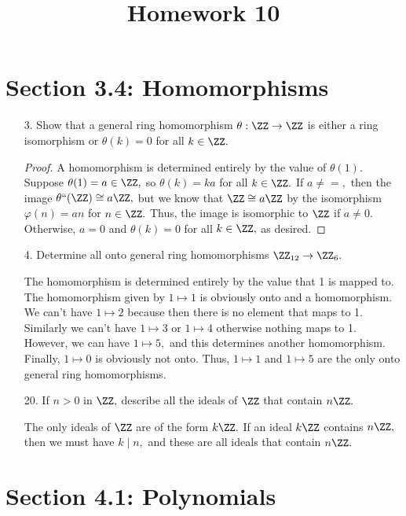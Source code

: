 \documentclass{article}
\begin{document}
\title{Homework 10}
\maketitle
\thispagestyle{fancy}

\section*{Section 3.4: Homomorphisms}

\begin{itemize}
	\item[3.] Show that a general ring homomorphism $\theta:\ZZ\to \ZZ$ is either a ring isomorphism or $\theta(k)=0$ for all $k\in \ZZ.$
		\begin{proof}
			A homomorphism is determined entirely by the value of $\theta(1).$ Suppose $\theta(1)=a\in\ZZ,$ so $\theta(k)=ka$ for all $k\in \ZZ.$ If $a\neq =,$ then the image $\theta``(\ZZ)\cong a\ZZ,$ but we know that $\ZZ\cong a\ZZ$ by the isomorphism $\varphi(n)=an$ for $n\in \ZZ.$ Thus, the image is isomorphic to $\ZZ$ if $a\neq 0.$ Otherwise, $a=0$ and $\theta(k)=0$ for all $k\in \ZZ,$ as desired.
		\end{proof}

	\item[4.] Determine all onto general ring homomorphisms $\ZZ_{12}\to\ZZ_6.$
		\begin{soln}
			The homomorphism is determined entirely by the value that 1 is mapped to. The homomorphism given by $1\mapsto 1$ is obviously onto and a homomorphism. We can't have $1\mapsto 2$ because then there is no element that maps to 1. Similarly we can't have $1\mapsto 3$ or $1\mapsto 4$ otherwise nothing maps to 1. However, we can have $1\mapsto 5,$ and this determines another homomorphism. Finally, $1\mapsto 0$ is obviously not onto. Thus, $1\mapsto 1$ and $1\mapsto 5$ are the only onto general ring homomorphisms.
		\end{soln}

	\item[20.] If $n>0$ in $\ZZ,$ describe all the ideals of $\ZZ$ that contain $n\ZZ.$
		\begin{soln}
			The only ideals of $\ZZ$ are of the form $k\ZZ.$ If an ideal $k\ZZ$ contains $n\ZZ,$ then we must have $k\mid n,$ and these are all ideals that contain $n\ZZ.$
		\end{soln}
		
\end{itemize}

\section*{Section 4.1: Polynomials}
\end{document}
